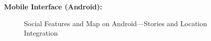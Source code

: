 \textbf{Mobile Interface (Android):}
\begin{figure}[!htbp]
    \centering
    \hspace{0.05\textwidth}
    \caption{Social Features and Map on Android---Stories and Location Integration}
    \label{fig:android_social_map}
\end{figure}


